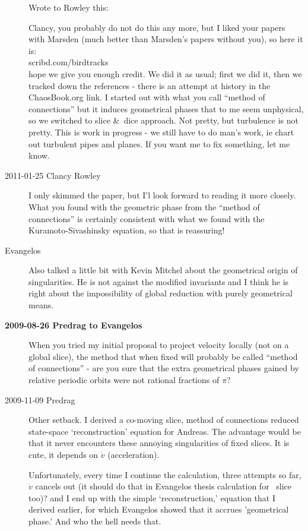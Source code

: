 \begin{description}
Wrote to Rowley this:

Clancy, you probably do not do this any more, but I liked your papers
with Marsden (much better than Marsden's papers without you), so here it
is:
\\
{scribd.com/birdtracks}
\\
hope we give you enough credit. We did it as usual; first we did it,
then we tracked down the references - there is an attempt at history
in the ChaosBook.org link. I started out with what you call ``method
of connections'' but it induces geometrical phases that to me seem
unphysical, so we switched to slice \&\ dice approach. Not pretty,
but turbulence is not pretty. This is work in progress - we still
have to do man's work, ie chart out turbulent pipes and planes. If
you want me to fix something, let me know.

\item[2011-01-25 Clancy Rowley]
I only skimmed the paper, but I'l look forward to reading it more
closely.  What you found with the geometric phase from the ``method
of connections'' is certainly consistent with what we found with the
Kuramoto-Sivashinsky equation, so that is reassuring!


\item[Evangelos]
Also talked a little bit with Kevin Mitchel about the geometrical origin
of singularities. He is not against the modified invariants and I think
he is right about the impossibility of global reduction with purely
geometrical means.

\item[\bf 2009-08-26 Predrag to Evangelos] When you tried my initial
proposal to project velocity locally (not on a global slice), the
method that when fixed will probably be called ``method of
connections'' - are you sure that the extra geometrical phases gained
by relative periodic orbits were not rational fractions of $\pi$?

\item[2009-11-09 Predrag]
Other setback. I derived a co-moving slice, method of
connections reduced state-space `reconstruction' equation for
Andreas. The advantage would be that it never encounters these
annoying singularities of fixed slices. It is cute, it depends
on $\dot{v}$ (acceleration).

Unfortunately, every time I continue the calculation, three
attempts so far, $\dot{v}$ cancels out (it should do that in
Evangelos thesis calculation for \reqv\ slice too)? and I end
up with the simple `reconstruction,' equation that I derived
earlier, for which Evangelos showed that it accrues
'geometrical phase.' And who the hell needs that.


\end{description}
